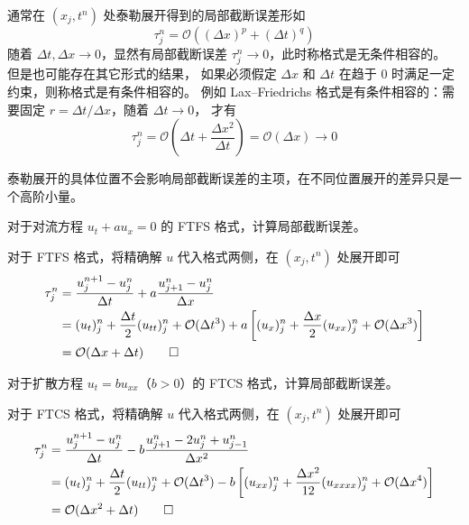 通常在 $(x_j,t^n)$ 处泰勒展开得到的局部截断误差形如
\[
    \tau_j^n =  \mathcal{O}((\Delta x)^p + (\Delta t)^q)
\]
随着 $\Delta t,\Delta x \to 0$，显然有局部截断误差 $\tau_j^n \to 0$，此时称格式是无条件相容的。
但是也可能存在其它形式的结果，
如果必须假定 $\Delta x$ 和 $\Delta t$ 在趋于 $0$ 时满足一定约束，则称格式是有条件相容的。
例如 Lax–Friedrichs 格式是有条件相容的：需要固定 $r = \Delta t/\Delta x$，随着 $\Delta t \to 0$，
才有
\[
    \tau_j^n =  \mathcal{O}(\Delta t + \frac{\Delta x^2}{\Delta t}) =  \mathcal{O}(\Delta x)\to 0
\]

\begin{remark}
    泰勒展开的具体位置不会影响局部截断误差的主项，在不同位置展开的差异只是一个高阶小量。
\end{remark}

\begin{example}
    对于对流方程 $u_t + a u_x = 0$ 的 FTFS 格式，计算局部截断误差。
\end{example}

\begin{solution*}
    对于 FTFS 格式，将精确解 $u$ 代入格式两侧，在 $(x_j,t^n)$ 处展开即可
    \begin{align*}
        \tau_j^n ={} & \frac{u_j^{n+1}-u_j^n}{\Delta t} + a \frac{u_{j+1}^n - u_j^n}{\Delta x} \\
        ={}          & (u_t)_j^n + \frac{\Delta t}2 (u_{tt})_j^n + \mathcal{O}(\Delta t^3)
        + a \left[
            (u_x)_j^n + \frac{\Delta x}2 (u_{xx})_j^n + \mathcal{O}(\Delta x^3)
        \right]                                                                                \\
        ={}          & \mathcal{O}(\Delta x + \Delta t) \qedhere
    \end{align*}
\end{solution*}

\begin{example}
    对于扩散方程 $u_t = b u_{xx}$（$b>0$）的 FTCS 格式，计算局部截断误差。
\end{example}

\begin{solution*}
    对于 FTCS 格式，将精确解 $u$ 代入格式两侧，在 $(x_j,t^n)$ 处展开即可
    \begin{align*}
        \tau_j^n ={} & \frac{u_j^{n+1}-u_j^n}{\Delta t} - b \frac{u_{j+1}^n - 2 u_j^n + u_{j-1}^n}{\Delta x^2} \\
        ={}          & (u_t)_j^n + \frac{\Delta t}2 (u_{tt})_j^n + \mathcal{O}(\Delta t^3)
        - b \left[
            (u_{xx})_{j}^n + \frac{\Delta x^2}{12} (u_{xxxx})_j^n + \mathcal{O}(\Delta x^4)
        \right]                                                                                                \\
        ={}          & \mathcal{O}(\Delta x^2 + \Delta t)  \qedhere
    \end{align*}
\end{solution*}


